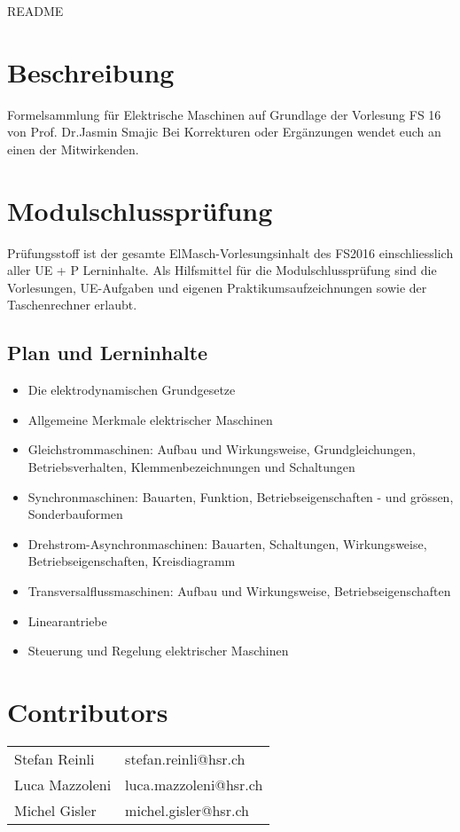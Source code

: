 \thispagestyle{empty}
\setcounter{page}{0}
{\huge README }
\section*{Beschreibung}
Formelsammlung für Elektrische Maschinen auf Grundlage der Vorlesung FS 16 von Prof. Dr.Jasmin Smajic \newline
Bei Korrekturen oder Ergänzungen wendet euch an einen der Mitwirkenden.

\section*{Modulschlussprüfung}
Prüfungsstoff ist der gesamte ElMasch-Vorlesungsinhalt des FS2016 einschliesslich aller UE + P Lerninhalte.\newline
Als Hilfsmittel für die Modulschlussprüfung sind die Vorlesungen,\newline
UE-Aufgaben und eigenen Praktikumsaufzeichnungen sowie der Taschenrechner erlaubt.

\subsection*{Plan und Lerninhalte}
{\scriptsize 
\begin{itemize}
    \item Die elektrodynamischen Grundgesetze 
    \item Allgemeine Merkmale elektrischer Maschinen 
    \item Gleichstrommaschinen: 
    \subitem Aufbau und Wirkungsweise, Grundgleichungen, Betriebsverhalten, Klemmenbezeichnungen und Schaltungen 
    \item Synchronmaschinen: Bauarten, Funktion, Betriebseigenschaften - und grössen, Sonderbauformen 
    \item Drehstrom-Asynchronmaschinen: 
    \subitem Bauarten, Schaltungen, Wirkungsweise, Betriebseigenschaften, Kreisdiagramm 
    \item Transversalflussmaschinen: Aufbau und Wirkungsweise, Betriebseigenschaften
    \item Linearantriebe
    \item Steuerung und Regelung elektrischer Maschinen
\end{itemize}
}
\vfill
\section*{Contributors}
\begin{tabular}{ll}
    Stefan Reinli & stefan.reinli@hsr.ch \\ 
    Luca Mazzoleni& luca.mazzoleni@hsr.ch \\ 
    Michel Gisler& michel.gisler@hsr.ch \\ 
\end{tabular} 

